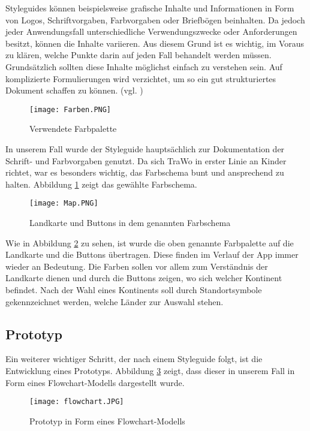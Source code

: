 Styleguides können beispielsweise grafische Inhalte und Informationen in Form von Logos, Schriftvorgaben, Farbvorgaben oder Briefbögen beinhalten. Da jedoch jeder Anwendungsfall unterschiedliche Verwendungszwecke oder Anforderungen besitzt, können die Inhalte variieren. Aus diesem Grund ist es wichtig, im Voraus zu klären, welche Punkte darin auf jeden Fall behandelt werden müssen. Grundsätzlich sollten diese Inhalte möglichst einfach zu verstehen sein. Auf komplizierte Formulierungen wird verzichtet, um so ein gut strukturiertes Dokument schaffen zu können. (vgl. \cite{Styleguide})

\begin{figure} [h]
\centering
\texttt{[image: Farben.PNG]}
\caption{Verwendete Farbpalette}
\label{fig:farben}
\end{figure}

In unserem Fall wurde der Styleguide hauptsächlich zur Dokumentation der Schrift- und Farbvorgaben genutzt. Da sich TraWo in erster Linie an Kinder richtet, war es besonders wichtig, das Farbschema bunt und ansprechend zu halten. Abbildung \ref{fig:farben} zeigt das gewählte Farbschema.

\begin{figure} [h]
\centering
\texttt{[image: Map.PNG]}
\caption{Landkarte und Buttons in dem genannten Farbschema}
\label{fig:map}
\end{figure}

Wie in Abbildung \ref{fig:map} zu sehen, ist wurde die oben genannte Farbpalette auf die Landkarte und die Buttons übertragen. Diese finden im Verlauf der App immer wieder an Bedeutung. Die Farben sollen vor allem zum Verständnis der Landkarte dienen und durch die Buttons zeigen, wo sich welcher Kontinent befindet. Nach der Wahl eines Kontinents soll durch Standortsymbole gekennzeichnet werden, welche Länder zur Auswahl stehen.

\subsection{Prototyp}\label{prototyp}
Ein weiterer wichtiger Schritt, der nach einem Styleguide folgt, ist die Entwicklung eines Prototyps. Abbildung \ref{fig:flowchart} zeigt, dass dieser in unserem Fall in Form eines Flowchart-Modells dargestellt wurde.

\begin{figure} [htb!]
\centering
\texttt{[image: flowchart.JPG]}
\caption{Prototyp in Form eines Flowchart-Modells}
\label{fig:flowchart}
\end{figure}

